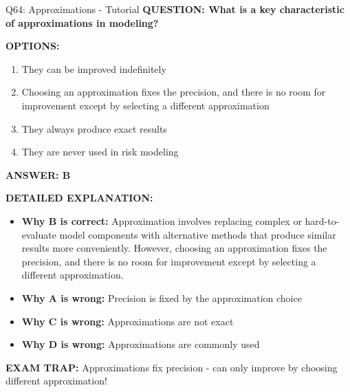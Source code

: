 \documentclass[8pt]{beamer}
\begin{document}
	\begin{frame}{Q64: Approximations - Tutorial}
		\fontsize{6.5}{7.5}\selectfont
		\textbf{QUESTION: What is a key characteristic of approximations in modeling?}
		
		\vspace{0.1cm}
		\textbf{OPTIONS:}
		\begin{enumerate}
			\item They can be improved indefinitely
			\item Choosing an approximation fixes the precision, and there is no room for improvement except by selecting a different approximation
			\item They always produce exact results
			\item They are never used in risk modeling
		\end{enumerate}
		
		\vspace{0.1cm}
		\textcolor{myblue}{\textbf{ANSWER: B}}
		
		\vspace{0.1cm}
		\textbf{DETAILED EXPLANATION:}
		\begin{itemize}
			\item \textbf{Why B is correct:} Approximation involves replacing complex or hard-to-evaluate model components with alternative methods that produce similar results more conveniently. However, choosing an approximation fixes the precision, and there is no room for improvement except by selecting a different approximation.
			\item \textbf{Why A is wrong:} Precision is fixed by the approximation choice
			\item \textbf{Why C is wrong:} Approximations are not exact
			\item \textbf{Why D is wrong:} Approximations are commonly used
		\end{itemize}
		
		\textcolor{myred}{\textbf{EXAM TRAP:}} Approximations \textcolor{myblue}{fix precision} - can only improve by choosing different approximation!
	\end{frame}
	
\end{document}
